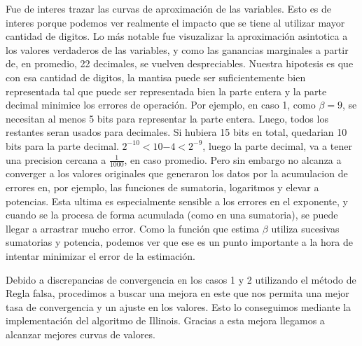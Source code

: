 Fue de interes trazar las curvas de aproximaci\'on de las variables. Esto es de interes porque podemos ver 
realmente el impacto que se tiene al utilizar mayor cantidad de digitos. Lo m\'as notable fue visuzalizar la 
aproximaci\'on asintotica a los valores verdaderos de las variables, y como las ganancias marginales a partir de,
en promedio, 22 decimales, se vuelven despreciables. Nuestra hipotesis es que con esa cantidad de digitos, la mantisa
puede ser suficientemente bien representada tal que puede ser representada bien la parte entera y la parte decimal 
minimice los errores de operaci\'on. Por ejemplo, en caso 1, como $\beta = 9$, se necesitan al menos 5 bits para representar la parte entera.
Luego, todos los restantes seran usados para decimales. Si hubiera 15 bits en total, quedarian 10 bits para la parte decimal. $2^{-10}<10{-4}<2^{-9}$, luego
la parte decimal, va a tener una precision cercana a $\frac{1}{1000}$, en caso promedio. Pero sin embargo no alcanza
a converger a los valores originales que generaron los datos por la acumulacion de errores en, por ejemplo, las funciones
de sumatoria, logaritmos y elevar a potencias. Esta ultima es especialmente sensible a los errores en el exponente, y cuando 
se la procesa de forma acumulada (como en una sumatoria), se puede llegar a arrastrar mucho error. Como la funci\'on que estima
$\beta$ utiliza sucesivas sumatorias y potencia, podemos ver que ese es un punto importante a la hora de intentar minimizar el error de 
la estimaci\'on.

Debido a discrepancias de convergencia en los casos 1 y 2 utilizando el m\'etodo
de Regla falsa, procedimos a buscar una mejora en este que nos permita una mejor
tasa de convergencia y un ajuste en los valores. Esto lo conseguimos mediante la
implementaci\'on del algoritmo de Illinois. Gracias a esta mejora llegamos a
alcanzar mejores curvas de valores.
